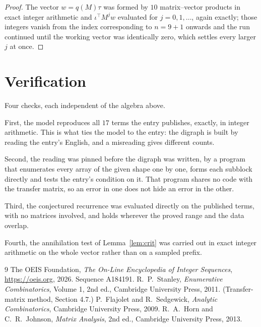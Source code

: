 \documentclass[11pt,a4paper]{article}
\theoremstyle{plain}
\theoremstyle{definition}
\begin{document}
\begin{proof}
The vector $w=q(M)\tau$ was formed by $10$ matrix--vector products in exact integer
arithmetic and $\iota^{\!\top}M^{j}w$ evaluated for $j=0,1,\dots$, again exactly; those
integers vanish from the index corresponding to $n=9+1$ onwards and the run continued
until the working vector was identically zero, which settles every larger $j$ at once.
\end{proof}

\section{Verification}

Four checks, each independent of the algebra above.

First, the model reproduces all $17$ terms the entry publishes, exactly, in integer
arithmetic. This is what ties the model to the entry: the digraph is built by reading the
entry's English, and a misreading gives different counts.

Second, the reading was pinned before the digraph was written, by a program that enumerates
every array of the given shape one by one, forms each subblock directly and tests the entry's
condition on it. That program shares no code with the transfer matrix, so an error in one does
not hide an error in the other.

Third, the conjectured recurrence was evaluated directly on the published terms, with no
matrices involved, and holds wherever the proved range and the data overlap.

Fourth, the annihilation test of Lemma~\ref{lem:crit} was carried out in exact integer
arithmetic on the whole vector rather than on a sampled prefix.

\begin{thebibliography}{9}
 The OEIS Foundation, \emph{The On-Line Encyclopedia of Integer
Sequences}, \url{https://oeis.org}, 2026. Sequence A184191.
 R.~P.~Stanley, \emph{Enumerative Combinatorics}, Volume 1, 2nd ed.,
Cambridge University Press, 2011. (Transfer-matrix method, Section 4.7.)
 P.~Flajolet and R.~Sedgewick, \emph{Analytic Combinatorics}, Cambridge
University Press, 2009.
 R.~A.~Horn and C.~R.~Johnson, \emph{Matrix Analysis}, 2nd ed., Cambridge
University Press, 2013.
\end{thebibliography}
\end{document}
